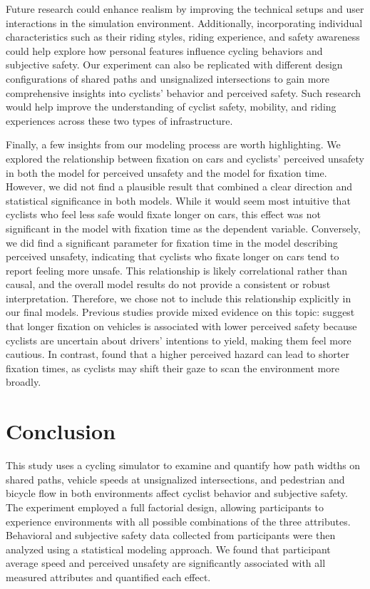 \documentclass[3p,authoryear]{elsarticle}
\begin{document}
Future research could enhance realism by improving the technical setups and user
interactions in the simulation environment. Additionally, incorporating
individual characteristics such as their riding styles, riding experience, and
safety awareness could help explore how personal features influence cycling
behaviors and subjective safety. Our experiment can also be replicated with
different design configurations of shared paths and unsignalized intersections to
gain more comprehensive insights into cyclists' behavior and perceived safety.
Such research would help improve the understanding of cyclist safety, mobility,
and riding experiences across these two types of infrastructure.

Finally, a few insights from our modeling process are worth highlighting. We
explored the relationship between fixation on cars and cyclists' perceived
unsafety in both the model for perceived unsafety and the model for fixation
time. However, we did not find a plausible result that combined a clear direction
and statistical significance in both models. While it would seem most intuitive
that cyclists who feel less safe would fixate longer on cars, this effect was not
significant in the model with fixation time as the dependent variable.
Conversely, we did find a significant parameter for fixation time in the model
describing perceived unsafety, indicating that cyclists who fixate longer on cars
tend to report feeling more unsafe. This relationship is likely correlational
rather than causal, and the overall model results do not provide a consistent or
robust interpretation. Therefore, we chose not to include this relationship
explicitly in our final models. Previous studies provide mixed evidence on this
topic: \citet{mohammadi2024understanding} suggest that longer fixation on
vehicles is associated with lower perceived safety because cyclists are uncertain
about drivers' intentions to yield, making them feel more cautious. In contrast,
\citet{stulpnagel2020gaze} found that a higher perceived hazard can lead to
shorter fixation times, as cyclists may shift their gaze to scan the environment
more broadly.

\section{Conclusion}\label{sec:conclusion}
This study uses a cycling simulator to examine and quantify how path widths on
shared paths, vehicle speeds at unsignalized intersections, and pedestrian and
bicycle flow in both environments affect cyclist behavior and subjective safety.
The experiment employed a full factorial design, allowing participants to
experience environments with all possible combinations of the three attributes.
Behavioral and subjective safety data collected from participants were then
analyzed using a statistical modeling approach. We found that participant average
speed and perceived unsafety are significantly associated with all measured
attributes and quantified each effect.
\end{document}
